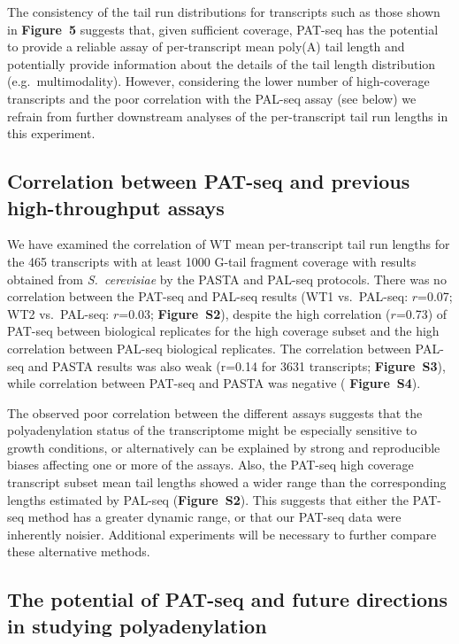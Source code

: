 \documentclass[10pt]{article}
\begin{document}
The consistency of the tail run distributions for transcripts such as those shown in \textbf{Figure~5} suggests that, given sufficient coverage, PAT-seq has the potential to provide a reliable assay of per-transcript mean poly(A) tail length and potentially provide information about the details of the tail length distribution (e.g.~multimodality). However, considering the lower number of high-coverage transcripts and the poor correlation with the PAL-seq assay (see below) we refrain from further downstream analyses of the per-transcript tail run lengths in this experiment.

\subsection*{Correlation between PAT-seq and previous high-throughput assays}

We have examined the correlation of WT mean per-transcript tail run lengths for the 465 transcripts with at least 1000 G-tail fragment coverage with results obtained from \textit{S.~cerevisiae} by the PASTA \cite{beilharz07} and PAL-seq \cite{subtelny14} protocols. There was no correlation between the PAT-seq and PAL-seq results (WT1 vs.\ PAL-seq: $r$=0.07; WT2 vs.\ PAL-seq: $r$=0.03; \textbf{Figure~S2}), despite the high correlation ($r$=0.73) of PAT-seq between biological replicates for the high coverage subset and the high correlation between PAL-seq biological replicates. The correlation between PAL-seq and PASTA results was also weak (r=0.14 for 3631 transcripts; \textbf{Figure~S3}), while correlation between PAT-seq and PASTA was negative ( \textbf{Figure~S4}).

The observed poor correlation between the different assays suggests that the polyadenylation status of the transcriptome might be especially sensitive to growth conditions, or alternatively can be explained by strong and reproducible biases affecting one or more of the assays. Also, the PAT-seq high coverage transcript subset mean tail lengths showed a wider range than the corresponding lengths estimated by PAL-seq (\textbf{Figure~S2}).  This suggests that either the PAT-seq method has a greater dynamic range, or that our PAT-seq data were inherently noisier. Additional experiments will be necessary to further compare these alternative methods.

\subsection*{The potential of PAT-seq and future directions in studying polyadenylation}
\end{document}
